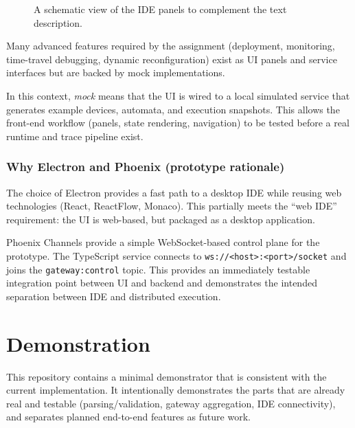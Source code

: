 \begin{figure}[h]
\centering
{}
\caption{A schematic view of the IDE panels to complement the text description.}
\end{figure}

Many advanced features required by the assignment (deployment, monitoring, time-travel debugging, dynamic reconfiguration) exist as UI panels and service interfaces but are backed by mock implementations.

In this context, \emph{mock} means that the UI is wired to a local simulated service that generates example devices, automata, and execution snapshots.
This allows the front-end workflow (panels, state rendering, navigation) to be tested before a real runtime and trace pipeline exist.

\subsection{Why Electron and Phoenix (prototype rationale)}

The choice of Electron provides a fast path to a desktop IDE while reusing web technologies (React, ReactFlow, Monaco).
This partially meets the ``web IDE'' requirement: the UI is web-based, but packaged as a desktop application.

Phoenix Channels provide a simple WebSocket-based control plane for the prototype. The TypeScript service connects to \texttt{ws://<host>:<port>/socket} and joins the \texttt{gateway:control} topic.
This provides an immediately testable integration point between UI and backend and demonstrates the intended separation between IDE and distributed execution.

\chapter{Demonstration}
\label{ch:demo}

This repository contains a minimal demonstrator that is consistent with the current implementation.
It intentionally demonstrates the parts that are already real and testable (parsing/validation, gateway aggregation, IDE connectivity), and separates planned end-to-end features as future work.

